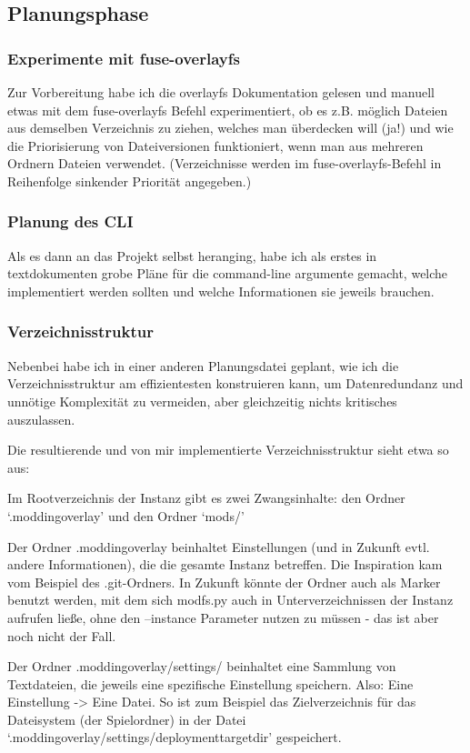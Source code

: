 \documentclass[a4paper,numbers=withenddot,11pt]{scrartcl}
\begin{document}
\subsection{Planungsphase}
\subsubsection{Experimente mit fuse-overlayfs}
Zur Vorbereitung habe ich die overlayfs Dokumentation gelesen und
manuell etwas mit dem fuse-overlayfs Befehl experimentiert,
ob es z.B. möglich Dateien aus demselben Verzeichnis zu ziehen, welches man überdecken will
(ja!) und wie die Priorisierung von Dateiversionen funktioniert, wenn man aus mehreren
Ordnern Dateien verwendet.
(Verzeichnisse werden im fuse-overlayfs-Befehl in Reihenfolge sinkender Priorität angegeben.)

\subsubsection{Planung des CLI}
Als es dann an das Projekt selbst heranging, habe ich als erstes
in textdokumenten grobe Pläne für die command-line argumente gemacht,
welche implementiert werden sollten und welche Informationen sie jeweils brauchen.

\subsubsection{Verzeichnisstruktur}
Nebenbei habe ich in einer anderen Planungsdatei geplant,
wie ich die Verzeichnisstruktur am effizientesten konstruieren kann,
um Datenredundanz und unnötige Komplexität zu vermeiden,
aber gleichzeitig nichts kritisches auszulassen.

Die resultierende und von mir implementierte Verzeichnisstruktur sieht etwa so aus:

Im Rootverzeichnis der Instanz gibt es zwei Zwangsinhalte:
den Ordner `.moddingoverlay' und den Ordner `mods/'

Der Ordner .moddingoverlay beinhaltet Einstellungen
(und in Zukunft evtl. andere Informationen), die die gesamte Instanz betreffen.
Die Inspiration kam vom Beispiel des .git-Ordners.
In Zukunft könnte der Ordner auch als Marker benutzt werden, mit dem sich
modfs.py auch in Unterverzeichnissen der Instanz aufrufen ließe,
ohne den --instance Parameter nutzen zu müssen - das ist aber noch nicht der Fall.

Der Ordner .moddingoverlay/settings/ beinhaltet eine Sammlung
von Textdateien, die jeweils eine spezifische Einstellung speichern.
Also: Eine Einstellung -> Eine Datei.
So ist zum Beispiel das Zielverzeichnis für das Dateisystem (der Spielordner)
in der Datei `.moddingoverlay/settings/deploymenttargetdir' gespeichert.
\end{document}
